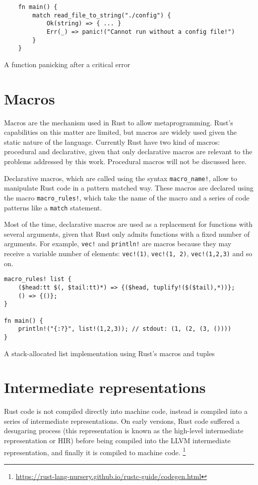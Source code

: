 \begin{listing}[ht]
	\begin{verbatim}
    fn main() {
        match read_file_to_string("./config") {
            Ok(string) => { ... }
            Err(_) => panic!("Cannot run without a config file!")
        }
    }
    \end{verbatim}
  \caption{A function panicking after a critical error}
  \label{lst:unrecoverable_error}
\end{listing}

\section{Macros}
Macros are the mechanism used in Rust to allow metaprogramming. Rust's capabilities on this matter are limited, but macros are widely used given the static nature of the language. Currently Rust have two kind of macros: procedural and declarative, given that only declarative macros are relevant to the problems addressed by this work. Procedural macros will not be discussed here.

Declarative macros, which are called using the syntax \texttt{macro\_name!}, allow to manipulate Rust code in a pattern matched way. These macros are declared using the macro \texttt{macro\_rules!}, which take the name of the macro and a series of code patterns like a \texttt{match} statement. 

Most of the time, declarative macros are used as a replacement for functions with several arguments, given that Rust only admits functions with a fixed number of arguments. For example, \texttt{vec!} and \texttt{println!} are macros because they may receive a variable number of elements: \texttt{vec!(1)},  \texttt{vec!(1, 2)},  \texttt{vec!(1,2,3)} and so on.


\begin{listing}[ht]
	\begin{verbatim}
macro_rules! list {
    ($head:tt $(, $tail:tt)*) => {($head, tuplify!($($tail),*))};
    () => {()};
}

fn main() {
    println!("{:?}", list!(1,2,3)); // stdout: (1, (2, (3, ())))
}
    \end{verbatim}
  \caption{A stack-allocated list implementation using Rust's macros and tuples}
  \label{lst:unrecoverable_error}
\end{listing}
\section{Intermediate representations}
Rust code is not compiled directly into machine code, instead is compiled into a series of intermediate representations. On early versions, Rust code suffered a desugaring process (this representation is known as the high-level intermediate representation or HIR) before being compiled into the LLVM intermediate representation, and finally it is compiled to machine code. \footnote{\url{https://rust-lang-nursery.github.io/rustc-guide/codegen.html}}

